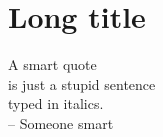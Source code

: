\documentclass[../main]{subfiles}
\begin{document}
\chapter[SHORT TITLE FOR TOC]{Long title}
\label{ch:ch1}
\begin{chquote}
A smart quote \\
is just a stupid sentence \\
typed in italics. \\
\bigskip
-- Someone smart
\end{chquote}

\clearpage
\lipsum[1-10]

\ifSubfilesClassLoaded{%
\printbibliography
}{}
\end{document}
